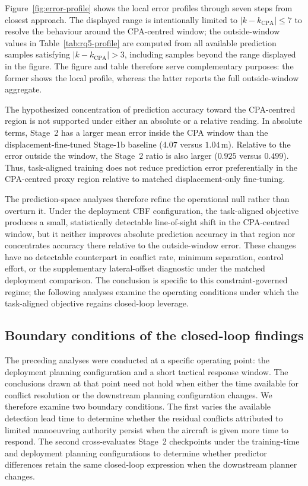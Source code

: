 \documentclass[11pt]{article}
\theoremstyle{plain}
\theoremstyle{definition}
\begin{document}
Figure~\ref{fig:error-profile} shows the local error profiles through
seven steps from closest approach. The displayed range is intentionally
limited to $|k-k_{\mathrm{CPA}}|\leq7$ to resolve the behaviour around
the CPA-centred window; the outside-window values in
Table~\ref{tab:rq5-profile} are computed from all available prediction
samples satisfying $|k-k_{\mathrm{CPA}}|>3$, including samples beyond
the range displayed in the figure. The figure and table therefore
serve complementary purposes: the former shows the local profile,
whereas the latter reports the full outside-window aggregate.

The hypothesized concentration of prediction accuracy toward the
CPA-centred region is not supported under either an absolute or a
relative reading. In absolute terms, Stage~2 has a larger mean error
inside the CPA window than the displacement-fine-tuned Stage-1b
baseline ($4.07$ versus $1.04$\,m). Relative to the error outside the
window, the Stage~2 ratio is also larger
($0.925$ versus $0.499$). Thus, task-aligned training does not reduce
prediction error preferentially in the CPA-centred proxy region
relative to matched displacement-only fine-tuning.

The prediction-space analyses therefore refine the operational null
rather than overturn it. Under the deployment CBF configuration, the
task-aligned objective produces a small, statistically detectable
line-of-sight shift in the CPA-centred window, but it neither improves
absolute prediction accuracy in that region nor concentrates accuracy
there relative to the outside-window error. These changes have no
detectable counterpart in conflict rate, minimum separation, control
effort, or the supplementary lateral-offset diagnostic under the
matched deployment comparison. The conclusion is specific to this
constraint-governed regime; the following analyses examine the
operating conditions under which the task-aligned objective regains
closed-loop leverage.


\subsection{Boundary conditions of the closed-loop findings}
\label{sec:results-boundary}

The preceding analyses were conducted at a specific operating point:
the deployment planning configuration and a short tactical response
window. The conclusions drawn at that point need not hold when either
the time available for conflict resolution or the downstream planning
configuration changes. We therefore examine two boundary conditions.
The first varies the available detection lead time to determine whether
the residual conflicts attributed to limited manoeuvring authority
persist when the aircraft is given more time to respond. The second
cross-evaluates Stage~2 checkpoints under the training-time and
deployment planning configurations to determine whether predictor
differences retain the same closed-loop expression when the downstream
planner changes.
\end{document}
